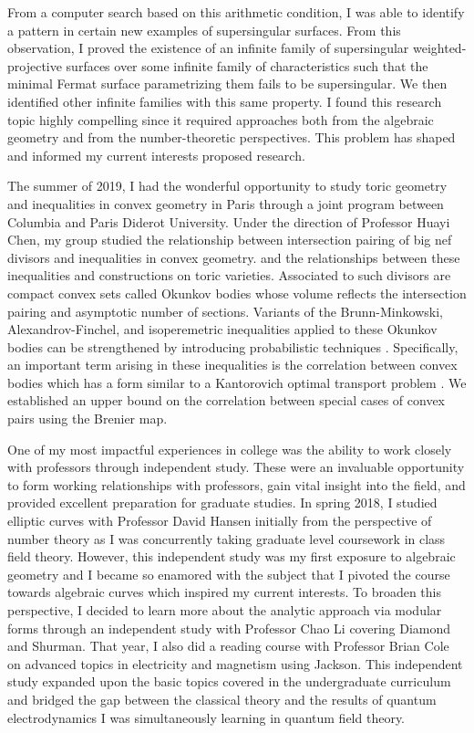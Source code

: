 \documentclass[11pt]{amsart}
\begin{document}
From a computer search based on this arithmetic condition, I was able to identify a pattern in certain new examples of supersingular surfaces. From this observation, I proved the existence of an infinite family of supersingular weighted-projective surfaces over some infinite family of characteristics such that the minimal Fermat surface parametrizing them fails to be supersingular. We then identified other infinite families with this same property. I found this research topic highly compelling since it required approaches both from the algebraic geometry and from the number-theoretic perspectives. This problem has shaped and informed my current interests proposed research.
\par
The summer of 2019, I had the wonderful opportunity to study toric geometry and inequalities in convex geometry in Paris through a joint program between Columbia and Paris Diderot University. Under the direction of Professor Huayi Chen, my group studied the relationship between intersection pairing of big nef divisors and inequalities in convex geometry. and the relationships between these inequalities and constructions on toric varieties. Associated to such divisors are compact convex sets called Okunkov bodies whose volume reflects the intersection pairing and asymptotic number of sections. Variants of the Brunn-Minkowski, Alexandrov-Finchel, and isoperemetric inequalities applied to these Okunkov bodies can be strengthened by introducing probabilistic techniques \cite{probabiliste}. Specifically, an important term arising in these inequalities is the correlation between convex bodies which has a form similar to a Kantorovich optimal transport problem  \cite{isoperimetric}. We established an upper bound on the correlation between special cases of convex pairs using the Brenier map.
\par
One of my most impactful experiences in college was the ability to work closely with professors through independent study. These were an invaluable opportunity to form working relationships with professors, gain vital insight into the field, and provided excellent preparation for graduate studies. In spring 2018, I studied elliptic curves with Professor David Hansen initially from the perspective of number theory as I was concurrently taking graduate level coursework in class field theory. However, this independent study was my first exposure to algebraic geometry and I became so enamored with the subject that I pivoted the course towards algebraic curves which inspired my current interests. To broaden this perspective, I decided to learn more about the analytic approach via modular forms through an independent study with Professor Chao Li covering Diamond and Shurman. That year, I also did a reading course with Professor Brian Cole on advanced topics in electricity and magnetism using Jackson. This independent study expanded upon the basic topics covered in the undergraduate curriculum and bridged the gap between the classical theory and the results of quantum electrodynamics I was simultaneously learning in quantum field theory. 
\end{document}
